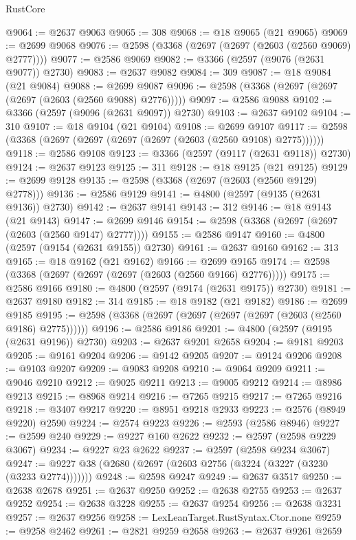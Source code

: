\begin{lexlean}{RustCore}
\begin{coremodule}
@9064 := @2637 @9063
@9065 := 308
@9068 := @18 @9065 (@21 @9065)
@9069 := @2699 @9068
@9076 := @2598 (@3368 (@2697 (@2697 (@2603 (@2560 @9069) @2777))))
@9077 := @2586 @9069
@9082 := @3366 (@2597 (@9076 (@2631 @9077)) @2730)
@9083 := @2637 @9082
@9084 := 309
@9087 := @18 @9084 (@21 @9084)
@9088 := @2699 @9087
@9096 := @2598 (@3368 (@2697 (@2697 (@2697 (@2603 (@2560 @9088) @2776)))))
@9097 := @2586 @9088
@9102 := @3366 (@2597 (@9096 (@2631 @9097)) @2730)
@9103 := @2637 @9102
@9104 := 310
@9107 := @18 @9104 (@21 @9104)
@9108 := @2699 @9107
@9117 := @2598 (@3368 (@2697 (@2697 (@2697 (@2697 (@2603 (@2560 @9108) @2775))))))
@9118 := @2586 @9108
@9123 := @3366 (@2597 (@9117 (@2631 @9118)) @2730)
@9124 := @2637 @9123
@9125 := 311
@9128 := @18 @9125 (@21 @9125)
@9129 := @2699 @9128
@9135 := @2598 (@3368 (@2697 (@2603 (@2560 @9129) @2778)))
@9136 := @2586 @9129
@9141 := @4800 (@2597 (@9135 (@2631 @9136)) @2730)
@9142 := @2637 @9141
@9143 := 312
@9146 := @18 @9143 (@21 @9143)
@9147 := @2699 @9146
@9154 := @2598 (@3368 (@2697 (@2697 (@2603 (@2560 @9147) @2777))))
@9155 := @2586 @9147
@9160 := @4800 (@2597 (@9154 (@2631 @9155)) @2730)
@9161 := @2637 @9160
@9162 := 313
@9165 := @18 @9162 (@21 @9162)
@9166 := @2699 @9165
@9174 := @2598 (@3368 (@2697 (@2697 (@2697 (@2603 (@2560 @9166) @2776)))))
@9175 := @2586 @9166
@9180 := @4800 (@2597 (@9174 (@2631 @9175)) @2730)
@9181 := @2637 @9180
@9182 := 314
@9185 := @18 @9182 (@21 @9182)
@9186 := @2699 @9185
@9195 := @2598 (@3368 (@2697 (@2697 (@2697 (@2697 (@2603 (@2560 @9186) @2775))))))
@9196 := @2586 @9186
@9201 := @4800 (@2597 (@9195 (@2631 @9196)) @2730)
@9203 := @2637 @9201 @2658
@9204 := @9181 @9203
@9205 := @9161 @9204
@9206 := @9142 @9205
@9207 := @9124 @9206
@9208 := @9103 @9207
@9209 := @9083 @9208
@9210 := @9064 @9209
@9211 := @9046 @9210
@9212 := @9025 @9211
@9213 := @9005 @9212
@9214 := @8986 @9213
@9215 := @8968 @9214
@9216 := @7265 @9215
@9217 := @7265 @9216
@9218 := @3407 @9217
@9220 := @8951 @9218 @2933
@9223 := @2576 (@8949 @9220) @2590
@9224 := @2574 @9223
@9226 := @2593 (@2586 @8946)
@9227 := @2599 @240
@9229 := @9227 @160 @2622
@9232 := @2597 (@2598 @9229 @3067)
@9234 := @9227 @23 @2622
@9237 := @2597 (@2598 @9234 @3067)
@9247 := @9227 @38 (@2680 (@2697 (@2603 @2756 (@3224 (@3227 (@3230 (@3233 @2774)))))))
@9248 := @2598 @9247
@9249 := @2637 @3517
@9250 := @2638 @2678
@9251 := @2637 @9250
@9252 := @2638 @2755
@9253 := @2637 @9252
@9254 := @2638 @3228
@9255 := @2637 @9254
@9256 := @2638 @3231
@9257 := @2637 @9256
@9258 := LexLeanTarget.RustSyntax.Ctor.none
@9259 := @9258 @2462
@9261 := @2821 @9259 @2658
@9263 := @2637 @9261 @2659

\end{coremodule}
\end{lexlean}

